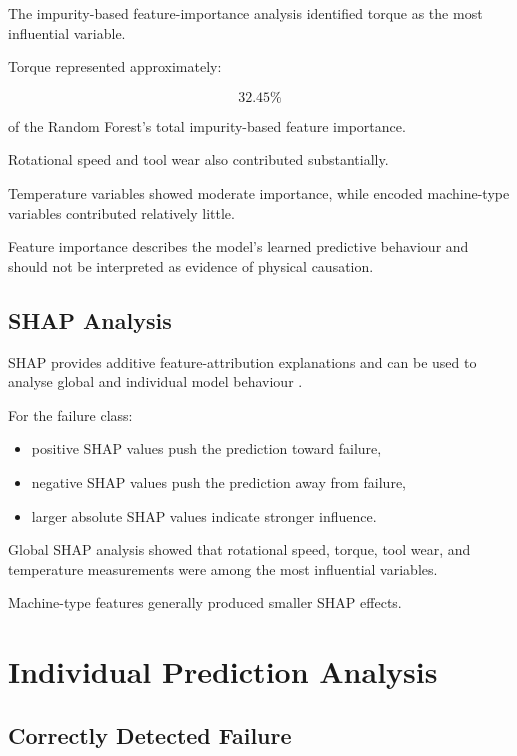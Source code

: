 \documentclass[conference]{IEEEtran}
\begin{document}
The impurity-based feature-importance analysis identified torque as the most influential variable.

Torque represented approximately:

\[
32.45\%
\]

of the Random Forest's total impurity-based feature importance.

Rotational speed and tool wear also contributed substantially.

Temperature variables showed moderate importance, while encoded machine-type variables contributed relatively little.

Feature importance describes the model's learned predictive behaviour and should not be interpreted as evidence of physical causation.

\subsection{SHAP Analysis}

SHAP provides additive feature-attribution explanations and can be used to analyse global and individual model behaviour \cite{lundberg2017}.

For the failure class:

\begin{itemize}

    \item positive SHAP values push the prediction toward failure,
    \item negative SHAP values push the prediction away from failure,
    \item larger absolute SHAP values indicate stronger influence.

\end{itemize}

Global SHAP analysis showed that rotational speed, torque, tool wear, and temperature measurements were among the most influential variables.

Machine-type features generally produced smaller SHAP effects.


\section{Individual Prediction Analysis}

\subsection{Correctly Detected Failure}
\end{document}
